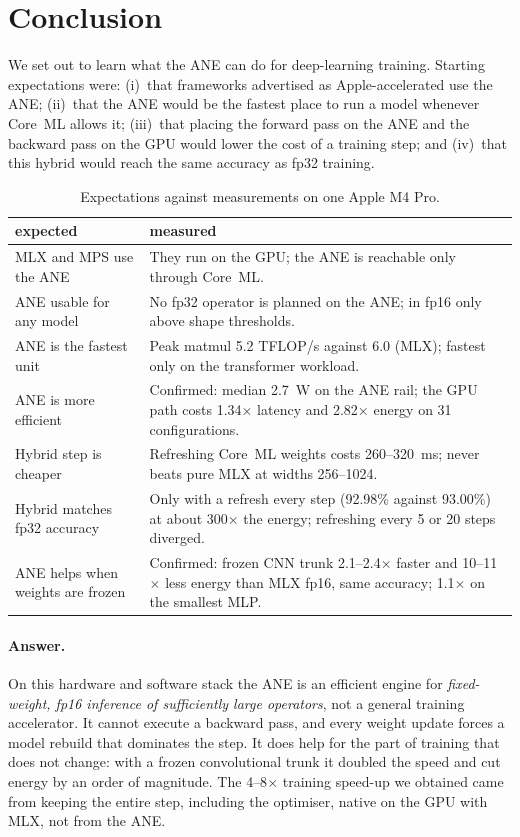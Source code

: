 \documentclass[11pt]{article}
\begin{document}
\section{Conclusion}
We set out to learn what the ANE can do for deep-learning training. Starting
expectations were: (i)~that frameworks advertised as Apple-accelerated use the
ANE; (ii)~that the ANE would be the fastest place to run a model whenever Core~ML
allows it; (iii)~that placing the forward pass on the ANE and the backward pass
on the GPU would lower the cost of a training step; and (iv)~that this hybrid
would reach the same accuracy as fp32 training.

\begin{table}[t]\centering
\caption{Expectations against measurements on one Apple M4 Pro.}\label{tab:conclusion}
\begin{tabular}{p{.34\linewidth}p{.56\linewidth}}\toprule
expected & measured \\\midrule
MLX and MPS use the ANE & They run on the GPU; the ANE is reachable only through Core~ML. \\
ANE usable for any model & No fp32 operator is planned on the ANE; in fp16 only above shape thresholds. \\
ANE is the fastest unit & Peak matmul 5.2 TFLOP/s against 6.0 (MLX); fastest only on the transformer workload. \\
ANE is more efficient & Confirmed: median 2.7~W on the ANE rail; the GPU path costs 1.34$\times$ latency and 2.82$\times$ energy on 31 configurations. \\
Hybrid step is cheaper & Refreshing Core~ML weights costs 260--320~ms; never beats pure MLX at widths 256--1024. \\
Hybrid matches fp32 accuracy & Only with a refresh every step (92.98\% against 93.00\%) at about 300$\times$ the energy; refreshing every 5 or 20 steps diverged. \\
ANE helps when weights are frozen & Confirmed: frozen CNN trunk 2.1--2.4$\times$ faster and 10--11$\times$ less energy than MLX fp16, same accuracy; 1.1$\times$ on the smallest MLP. \\
\bottomrule\end{tabular}\end{table}

\paragraph{Answer.} On this hardware and software stack the ANE is an efficient
engine for \emph{fixed-weight, fp16 inference of sufficiently large operators},
not a general training accelerator. It cannot execute a backward pass, and every weight
update forces a model rebuild that dominates the step. It does help for the
part of training that does not change: with a frozen convolutional trunk it
doubled the speed and cut energy by an order of magnitude. The 4--8$\times$
training speed-up we obtained came from keeping the entire step, including the
optimiser, native on the GPU with MLX, not from the ANE.
\end{document}
